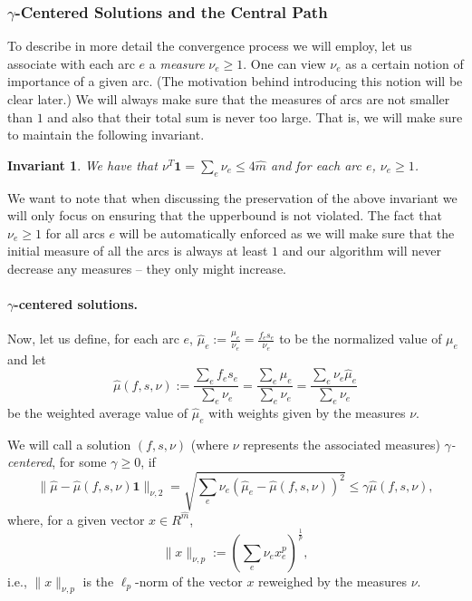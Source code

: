 \documentclass[11pt, letterpaper]{article}
\newtheorem{invariant}[theorem]{Invariant}
\newcommand{\onev}{\mathbf{1}}
\newcommand{\norm}[2]{\|#1\|_{#2}}
\newcommand{\hm}{\widehat{m}}
\newcommand{\hmu}{\hat{\mu}}
\newcommand{\vnu}{\boldsymbol{\mathit{\nu}}}
\newcommand{\hvmu}{\boldsymbol{\mathit{\hat{\mu}}}}
\newcommand{\ff}{\boldsymbol{\mathit{f}}}
\renewcommand{\ss}{\boldsymbol{\mathit{s}}}
\newcommand{\xx}{\boldsymbol{\mathit{x}}}
\newcommand{\RR}{\boldsymbol{\mathit{R}}}
\begin{document}
\subsubsection*{$\gamma$-Centered Solutions and the Central Path}

To describe in more detail the convergence process we will employ, let us associate with each arc $e$ a {\em measure} $\nu_e\geq 1$. One can view $\nu_e$ as a certain notion of importance of a given arc. (The motivation behind introducing this notion will be clear later.) We will always make sure that the measures of arcs are not smaller than $1$ and also that their total sum is never too large. That is, we will make sure to maintain the following invariant.

\begin{invariant}
\label{inv:measure_upperbound}
We have that $\vnu^T \onev = \sum_{e} \nu_e \leq 4\hm$ and for each arc $e$, $\nu_e\geq 1$.
\end{invariant}

We want to note that when discussing the preservation of the above invariant we will only focus on ensuring that the upperbound is not violated. The fact that $\nu_e\geq 1$ for all arcs $e$ will be automatically enforced as we will make sure that the initial measure of all the arcs is always at least $1$ and our algorithm will never decrease any measures -- they only might increase. 


\paragraph{$\gamma$-centered solutions.} Now, let us define, for each arc $e$, $\hmu_e:=\frac{\mu_e}{\nu_e}=\frac{f_es_e}{\nu_e}$ to be the normalized value of $\mu_e$ and let 
\begin{equation}
\label{eq:def_hmu}
\hmu(\ff,\ss,\vnu):=\frac{\sum_{e} f_e s_e}{\sum_{e} \nu_e}=\frac{\sum_{e} \mu_e}{\sum_{e} \nu_e}=\frac{\sum_{e} \nu_e \hmu_e}{\sum_{e} \nu_e}
\end{equation}
be the weighted average value of $\hmu_e$ with weights given by the measures $\vnu$.

We will call a solution $(\ff,\ss, \vnu)$ (where $\vnu$ represents the associated measures) {\em $\gamma$-centered}, for some $\gamma\geq 0$, if 
\begin{equation}
\label{eq:def_centrality}
\norm{\hvmu-\hmu(\ff,\ss,\vnu)\onev}{\vnu,2}=\sqrt{\sum_e \nu_e(\hmu_e-\hmu(\ff,\ss,\vnu))^2} \leq \gamma\hmu(\ff,\ss,\vnu),
\end{equation}
where, for a given vector $\xx\in \RR^{\hm}$,
\begin{equation}
\label{eq:def_norm_nu}
\norm{\xx}{\vnu,p}:=\left({\sum_e \nu_e x_e^p}\right)^{\frac{1}{p}},
\end{equation} 
i.e., $\norm{\xx}{\vnu,p}$ is the $\ell_p$-norm of the vector $\xx$ reweighed by the measures $\vnu$. 
\end{document}
